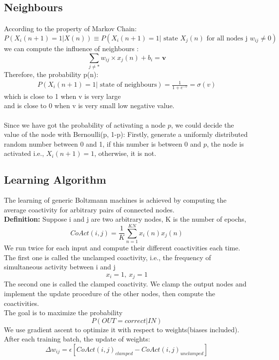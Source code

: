 \documentclass{article}
\begin{document}
\subsection{Neighbours}
\paragraph{}
According to the property of Markov Chain:
\[P(X_i(n+1)=1|X(n))\equiv P(X_i(n+1)=1|\text{ state }X_j(n)\text{ for all nodes j $w_{ij}\neq 0$})\]
we can compute the influence of neighbours :
\[\sum_{j\neq *}w_{ij}\times x_j(n)+b_i=\textbf{v}\]
Therefore, the probability p(n):
\begin{align*}
P(X_i(n+1)=1|\text{ state of neighbours})=\frac1{1+e^{-v}}= \sigma(v)
\end{align*}
which is close to 1 when v is very large\\
and is close to 0 when v is very small low negative value.\\
\paragraph{}
Since we have got the probability of activating a node $p$, we could decide the value of the node with Bernoulli(p, 1-p): Firstly, generate a uniformly distributed random number between 0 and 1, if this number is between 0 and $p$, the node is activated i.e., $X_{i}(n+1)=1$, otherwise, it is not.
\subsection{Learning Algorithm}
The learning of generic Boltzmann machines is achieved by computing the average coactivity for arbitrary pairs of connected nodes.\\
\textbf{Definition:} Suppose i and j are two arbitrary nodes, K is the number of epochs,
\[CoAct(i,j)=\frac{1}{K}\sum\limits_{n=1}^{KN}x_{i}(n)x_{j}(n)\]
We run twice for each input and compute their different coactivities each time. The first one is called the unclamped coactivity, i.e., the frequency of simultaneous activity between i and j \[x_{i}=1,\ x_{j}=1\]
The second one is called the clamped coactivity. We clamp the output nodes and implement the update procedure of the other nodes, then compute the coactivities.\\
The goal is to maximize the probability
\[P(OUT=correct|IN)\]
We use gradient ascent to optimize it with respect to weights(biases included).\\
After each training batch, the update of weights:
\[\Delta w_{ij}=\epsilon [CoAct(i,j)_{clamped}-CoAct(i,j)_{unclamped}]\]
\end{document}
